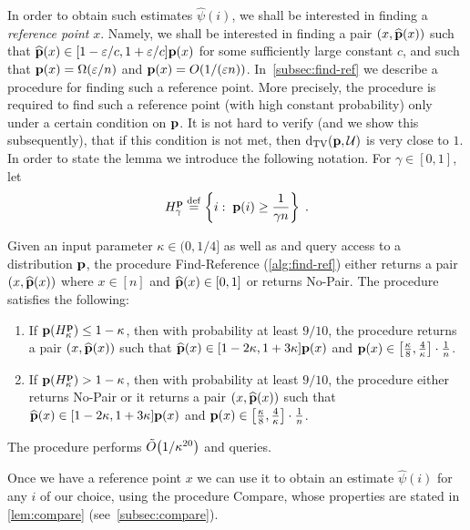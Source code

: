 In order to obtain such estimates $\hat{\psi}(i)$, we
shall be interested in finding a {\em reference point\/} $x$.
Namely, we shall be interested in finding a pair $(x,\widehat{\mathbf{p}}(x))$
such that $\widehat{\mathbf{p}}(x) \in [1-\varepsilon/c,1+\varepsilon/c]\mathbf{p}(x)$ for
some sufficiently large constant $c$, and such that
$\mathbf{p}(x) = \Omega(\varepsilon/n)$ and $\mathbf{p}(x) = O(1/(\varepsilon n))$.
In~\cref{subsec:find-ref} we describe a procedure for finding
such a reference point. More precisely, the procedure is required to
find such a reference point (with high constant probability) only
under a certain condition on $\mathbf{p}$. It is not hard to verify (and we show
this subsequently), that if this condition is not met, then
$\operatorname{d}_{\textrm{TV}}(\mathbf{p},\mathcal{U})$ is very close to $1$.
In order to
state the lemma we introduce the following notation. For
$\gamma\in[0,1]$, let
\begin{equation}\label{eq:H-def}
H^{\mathbf{p}}_\gamma \stackrel{\rm def}{=} \left\{i:\; \mathbf{p}(i) \geq \frac{1}{\gamma n}\right\}\;.
\end{equation}
\begin{lemma}\label{lem:find-ref}
Given an input parameter $\kappa \in (0,1/4]$ as
well as \SAMP and \PCOND query access to a distribution $\mathbf{p}$,
the procedure {\sc Find-Reference} (\cref{alg:find-ref})
 either returns a pair
$(x,\widehat{\mathbf{p}}(x))$ where $x\in [n]$ and $\widehat{\mathbf{p}}(x) \in [0,1]$ or
returns {\sf No-Pair}. The procedure satisfies the following:
\begin{enumerate}
\item If $\mathbf{p}(H^{\mathbf{p}}_\kappa) \leq 1-\kappa$,
then with probability at least $9/10$, the
procedure returns a pair $(x,\widehat{\mathbf{p}}(x))$ such that
$\widehat{\mathbf{p}}(x) \in [1-2\kappa,1+3\kappa]\mathbf{p}(x)$ and
$\mathbf{p}(x) \in \left[\frac{\kappa}{8},\frac{4}{\kappa}\right]\cdot \frac{1}{n}$.
\item If $\mathbf{p}(H^{\mathbf{p}}_\kappa) > 1-\kappa$, 
then with probability at least $9/10$, the
procedure either returns {\sf No-Pair} or it returns
a pair $(x,\widehat{\mathbf{p}}(x))$ such that
$\widehat{\mathbf{p}}(x) \in [1-2\kappa,1+3\kappa]\mathbf{p}(x)$ and
$\mathbf{p}(x) \in \left[\frac{\kappa}{8},\frac{4}{\kappa}\right]\cdot \frac{1}{n}$.
\end{enumerate}
The procedure performs $\tildeO{1/\kappa^{20}}$ \PCOND and \SAMP queries.
\end{lemma}
Once we have a reference point $x$ we can use it to obtain an
estimate $\hat{\psi}(i)$ for any $i$ of our choice, using
the procedure {\sc Compare}, whose properties are stated in
\cref{lem:compare} (see~\cref{subsec:compare}).


